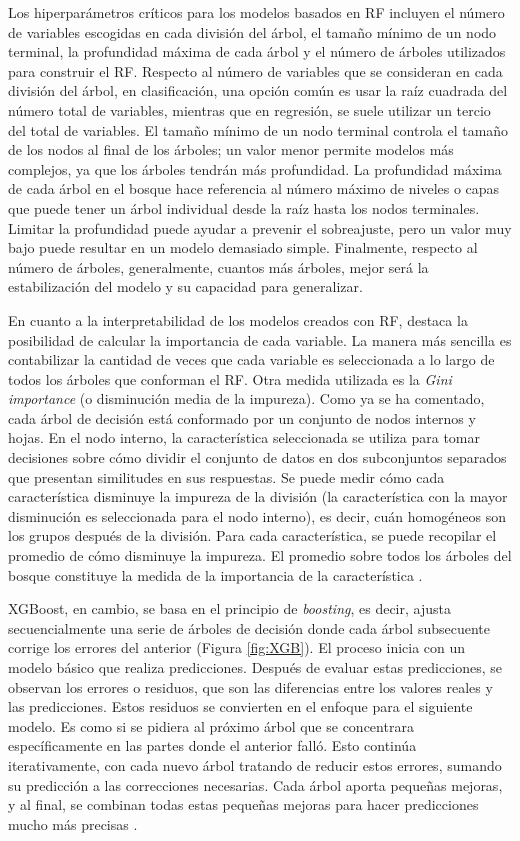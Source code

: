 Los hiperparámetros críticos para los modelos basados en RF incluyen el número de variables escogidas en cada división del árbol, el tamaño mínimo de un nodo terminal, la profundidad máxima de cada árbol y el número de árboles utilizados para construir el RF. Respecto al número de variables que se consideran en cada división del árbol, en clasificación, una opción común es usar la raíz cuadrada del número total de variables, mientras que en regresión, se suele utilizar un tercio del total de variables. El tamaño mínimo de un nodo terminal controla el tamaño de los nodos al final de los árboles; un valor menor permite modelos más complejos, ya que los árboles tendrán más profundidad. La profundidad máxima de cada árbol en el bosque hace referencia al número máximo de niveles o capas que puede tener un árbol individual desde la raíz hasta los nodos terminales. Limitar la profundidad puede ayudar a prevenir el sobreajuste, pero un valor muy bajo puede resultar en un modelo demasiado simple. Finalmente, respecto al número de árboles, generalmente, cuantos más árboles, mejor será la estabilización del modelo y su capacidad para generalizar.

En cuanto a la interpretabilidad de los modelos creados con RF, destaca la posibilidad de calcular la importancia de cada variable. La manera más sencilla es contabilizar la cantidad de veces que cada variable es seleccionada a lo largo de todos los árboles que conforman el RF. Otra medida utilizada es la \textit{Gini importance} (o disminución media de la impureza). Como ya se ha comentado, cada árbol de decisión está conformado por un conjunto de nodos internos y hojas. En el nodo interno, la característica seleccionada se utiliza para tomar decisiones sobre cómo dividir el conjunto de datos en dos subconjuntos separados que presentan similitudes en sus respuestas. Se puede medir cómo cada característica disminuye la impureza de la división (la característica con la mayor disminución es seleccionada para el nodo interno), es decir, cuán homogéneos son los grupos después de la división. Para cada característica, se puede recopilar el promedio de cómo disminuye la impureza. El promedio sobre todos los árboles del bosque constituye la medida de la importancia de la característica \cite{breiman2001random}.

XGBoost, en cambio, se basa en el principio de \textit{boosting}, es decir, ajusta secuencialmente una serie de árboles de decisión donde cada árbol subsecuente corrige los errores del anterior (Figura \ref{fig:XGB}). El proceso inicia con un modelo básico que realiza predicciones. Después de evaluar estas predicciones, se observan los errores o residuos, que son las diferencias entre los valores reales y las predicciones. Estos residuos se convierten en el enfoque para el siguiente modelo. Es como si se pidiera al próximo árbol que se concentrara específicamente en las partes donde el anterior falló. Esto continúa iterativamente, con cada nuevo árbol tratando de reducir estos errores, sumando su predicción a las correcciones necesarias. Cada árbol aporta pequeñas mejoras, y al final, se combinan todas estas pequeñas mejoras para hacer predicciones mucho más precisas \cite{chen2016xgboost}.


